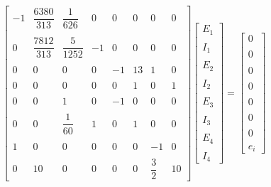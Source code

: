 \documentclass{article}
\numberwithin{equation}{section}
\let\dfr\dfrac
\begin{document}
\begin{equation*}
    \begin{bmatrix}
        -1 & \dfr{6380}{313} & \dfr{1}{626} & 0 & 0 & 0 & 0 & 0\\ \\
        0 & \dfr{7812}{313} & \dfr{5}{1252} & -1 & 0 & 0 & 0 & 0\\ \\
        0 & 0 & 0 & 0 & -1 & 13 & 1 & 0\\ \\
        0 & 0 & 0 & 0 & 0 & 1 & 0 & 1\\ \\
        0 & 0 & 1 & 0 & -1 & 0 & 0 & 0\\ \\
        0 & 0 & \dfr{1}{60} & 1 & 0 & 1 & 0 & 0\\ \\
        1 & 0 & 0 & 0 & 0 & 0 & -1 & 0\\ \\
        0 & 10 & 0 & 0 & 0 & 0 & \dfr{3}{2} & 10
    \end{bmatrix}
    \begin{bmatrix}
        E_1 \\ \\
        I_1 \\ \\
        E_2 \\ \\
        I_2 \\ \\
        E_3 \\ \\
        I_3 \\ \\
        E_4 \\ \\
        I_4
    \end{bmatrix}
    =
    \begin{bmatrix}
        0\\ \\
        0\\ \\
        0\\ \\
        0\\ \\
        0\\ \\
        0\\ \\
        0\\ \\
        e_i
    \end{bmatrix}
\end{equation*}
\end{document}
